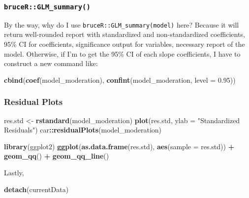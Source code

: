 \documentclass[
]{ctexart}
\newenvironment{Shaded}{\begin{snugshade}}{\end{snugshade}}
\newcommand{\AttributeTok}[1]{\textcolor[rgb]{0.13,0.29,0.53}{#1}}
\newcommand{\FloatTok}[1]{\textcolor[rgb]{0.00,0.00,0.81}{#1}}
\newcommand{\FunctionTok}[1]{\textcolor[rgb]{0.13,0.29,0.53}{\textbf{#1}}}
\newcommand{\NormalTok}[1]{#1}
\newcommand{\OtherTok}[1]{\textcolor[rgb]{0.56,0.35,0.01}{#1}}
\newcommand{\SpecialCharTok}[1]{\textcolor[rgb]{0.81,0.36,0.00}{\textbf{#1}}}
\newcommand{\StringTok}[1]{\textcolor[rgb]{0.31,0.60,0.02}{#1}}
\begin{document}
\hypertarget{brucerglm_summary}{%
\subsubsection{\texorpdfstring{\texttt{bruceR::GLM\_summary()}}{bruceR::GLM\_summary()}}\label{brucerglm_summary}}

By the way, why do I use \texttt{bruceR::GLM\_summary(model)} here?
Because it will return well-rounded report with standardized and
non-standardized coefficients, 95\% CI for coefficients, significance
output for variables, necessary report of the model. Otherwise, if I'm
to get the 95\% CI of each slope coefficients, I have to construct a new
command like:

\begin{Shaded}
\begin{Highlighting}[]
\FunctionTok{cbind}\NormalTok{(}\FunctionTok{coef}\NormalTok{(model\_moderation), }\FunctionTok{confint}\NormalTok{(model\_moderation, }\AttributeTok{level =} \FloatTok{0.95}\NormalTok{))}
\end{Highlighting}
\end{Shaded}

\hypertarget{residual-plots}{%
\subsubsection{Residual Plots}\label{residual-plots}}

\begin{Shaded}
\begin{Highlighting}[]
\NormalTok{res.std }\OtherTok{\textless{}{-}} \FunctionTok{rstandard}\NormalTok{(model\_moderation)}
\FunctionTok{plot}\NormalTok{(res.std, }\AttributeTok{ylab =} \StringTok{"Standardized Residuals"}\NormalTok{)}
\NormalTok{car}\SpecialCharTok{::}\FunctionTok{residualPlots}\NormalTok{(model\_moderation)}

\FunctionTok{library}\NormalTok{(ggplot2)}
\FunctionTok{ggplot}\NormalTok{(}\FunctionTok{as.data.frame}\NormalTok{(res.std), }\FunctionTok{aes}\NormalTok{(}\AttributeTok{sample =}\NormalTok{ res.std)) }\SpecialCharTok{+} \FunctionTok{geom\_qq}\NormalTok{() }\SpecialCharTok{+} \FunctionTok{geom\_qq\_line}\NormalTok{()}
\end{Highlighting}
\end{Shaded}

Lastly,

\begin{Shaded}
\begin{Highlighting}[]
\FunctionTok{detach}\NormalTok{(currentData)}
\end{Highlighting}
\end{Shaded}
\end{document}
